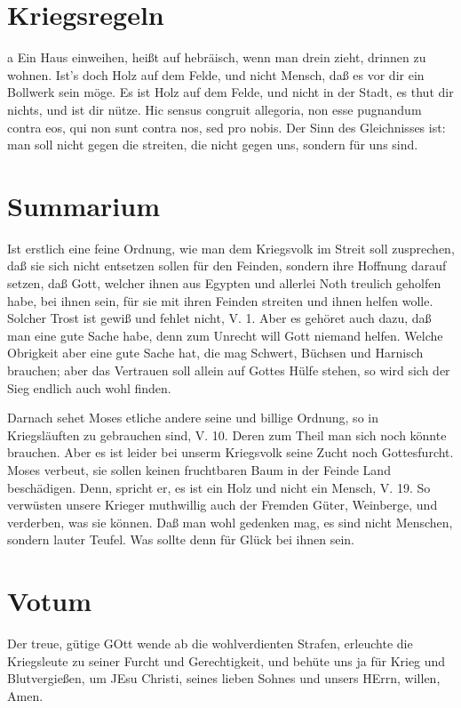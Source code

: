 \section{Kriegsregeln}

a Ein Haus einweihen, heißt auf hebräisch, wenn man drein zieht, drinnen zu wohnen.
Ist's doch Holz auf dem Felde, und nicht Mensch, daß es vor dir ein Bollwerk sein möge. Es ist Holz auf dem Felde, und nicht in der Stadt, es thut dir nichts, und ist dir nütze. Hic sensus congruit allegoria, non esse pugnandum contra eos, qui non sunt contra nos, sed pro nobis. Der Sinn des Gleichnisses ist: man soll nicht gegen die streiten, die nicht gegen uns, sondern für uns sind.

\section{Summarium}

Ist erstlich eine feine Ordnung, wie man dem Kriegsvolk im Streit soll zusprechen, daß sie sich nicht entsetzen sollen für den Feinden, sondern ihre Hoffnung darauf setzen, daß Gott, welcher ihnen aus Egypten und allerlei Noth treulich geholfen habe, bei ihnen sein, für sie mit ihren Feinden streiten und ihnen helfen wolle. Solcher Trost ist gewiß und fehlet nicht, V. 1. Aber es gehöret auch dazu, daß man eine gute Sache habe, denn zum Unrecht will Gott niemand helfen. Welche Obrigkeit aber eine gute Sache hat, die mag Schwert, Büchsen und Harnisch brauchen; aber das Vertrauen soll allein auf Gottes Hülfe stehen, so wird sich der Sieg endlich auch wohl finden.

Darnach sehet Moses etliche andere seine und billige Ordnung, so in Kriegsläuften zu gebrauchen sind, V. 10. Deren zum Theil man sich noch könnte brauchen. Aber es ist leider bei unserm Kriegsvolk seine Zucht noch Gottesfurcht. Moses verbeut, sie sollen keinen fruchtbaren Baum in der Feinde Land beschädigen. Denn, spricht er, es ist ein Holz und nicht ein Mensch, V. 19. So verwüsten unsere Krieger muthwillig auch der Fremden Güter, Weinberge, und verderben, was sie können. Daß man wohl gedenken mag, es sind nicht Menschen, sondern lauter Teufel. Was sollte denn für Glück bei ihnen sein.

\section{Votum}

Der treue, gütige GOtt wende ab die wohlverdienten Strafen, erleuchte die Kriegsleute zu seiner Furcht und Gerechtigkeit, und behüte uns ja für Krieg und Blutvergießen, um JEsu Christi, seines lieben Sohnes und unsers HErrn, willen, Amen.

